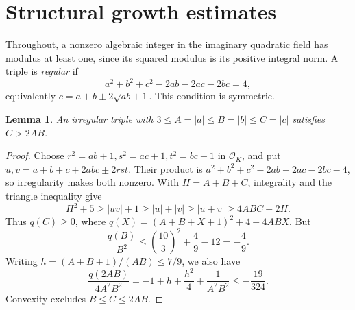 \documentclass[12pt]{article}
\newtheorem{lemma}[theorem]{Lemma}
\numberwithin{equation}{section}
\begin{document}
\section{Structural growth estimates}\label{sec:structural-growth}

Throughout, a nonzero algebraic integer in the imaginary quadratic field
has modulus at least one, since its squared modulus is its positive
integral norm. A triple is \emph{regular} if
\[
 a^2+b^2+c^2-2ab-2ac-2bc=4,
\]
equivalently \(c=a+b\pm2\sqrt{ab+1}\). This condition is symmetric.

\begin{lemma}\label{lem:irregular-growth}
An irregular triple with \(3\le A=|a|\le B=|b|\le C=|c|\) satisfies
\(C>2AB\).
\end{lemma}
\begin{proof}
Choose \(r^2=ab+1,s^2=ac+1,t^2=bc+1\) in \(\mathcal O_K\), and put
\(u,v=a+b+c+2abc\pm2rst\). Their product is
\(a^2+b^2+c^2-2ab-2ac-2bc-4\), so irregularity makes both nonzero.
With \(H=A+B+C\), integrality and the triangle inequality give
\[
 H^2+5\ge |uv|+1\ge |u|+|v|\ge|u+v|\ge4ABC-2H.
\]
Thus \(q(C)\ge0\), where \(q(X)=(A+B+X+1)^2+4-4ABX\).
But
\[
 \frac{q(B)}{B^2}\le\left(\frac{10}{3}\right)^2+\frac49-12=-\frac49.
\]
Writing \(h=(A+B+1)/(AB)\le7/9\), we also have
\[
 \frac{q(2AB)}{4A^2B^2}
 =-1+h+\frac{h^2}{4}+\frac1{A^2B^2}\le-\frac{19}{324}.
\]
Convexity excludes \(B\le C\le2AB\).
\end{proof}
\end{document}
